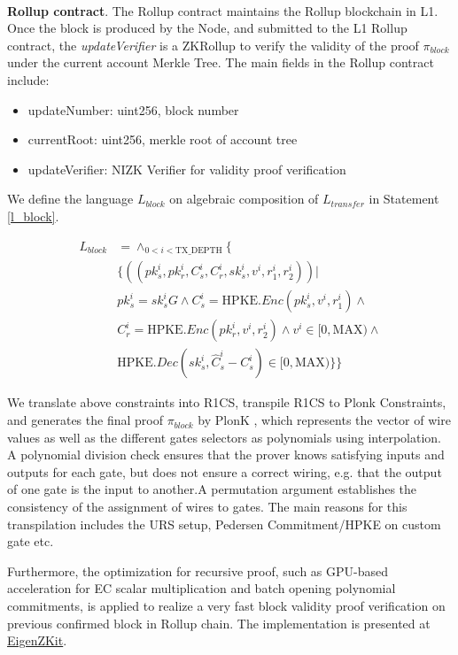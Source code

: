 \documentclass{article}
\begin{document}
~\\
\noindent\textbf{Rollup contract}. The Rollup contract maintains the Rollup blockchain in L1. Once the block is produced by the Node, and submitted to the L1 Rollup contract, the \textit{updateVerifier} is a ZKRollup to verify the validity of the proof $\pi_{block}$ under the current account Merkle Tree. The main fields in the Rollup contract include:
\begin{itemize}
    \item updateNumber: uint256, block number
    \item currentRoot: uint256, merkle root of account tree
    \item updateVerifier: NIZK Verifier for validity proof verification
\end{itemize}

We define the language $L_{block}$ on algebraic composition of $L_{transfer}$ in Statement \ref{l_block}.

\begin{equation}
\begin{aligned} \label{l_block}
    L_{block} &= \wedge_{0 < i < \mbox{TX\_DEPTH}} \{  \\
        &\{((pk_s^i, pk_r^i, C_s^i, C_r^i, sk_s^i, v^i, r_1^i, r_2^i)) | \\ 
        &pk_s^i = sk_s^iG \land C_s^i = \mbox{HPKE}.Enc(pk_s^i,v^i, r_1^i) \land \\
        &C_r^i =  \mbox{HPKE}.Enc(pk_r^i,v^i, r_2^i) \land v^i \in [0, \mbox{MAX}) \land \\
        &\mbox{HPKE}.Dec(sk_s^i, \hat{C}_s^i - C_s^i) \in [0, \mbox{MAX})\}\}
\end{aligned}
\end{equation}

We translate above constraints into R1CS, transpile R1CS to Plonk Constraints, and generates the final proof $\pi_{block}$ by PlonK \cite{gabizon2019plonk}, which represents the vector of wire values as well as the different gates selectors as polynomials using interpolation. A polynomial division check ensures that the prover knows satisfying inputs and outputs for each gate, but does not ensure a correct wiring, e.g. that the output of one gate is the input to another.A permutation argument establishes the consistency of the assignment of wires to gates. The main reasons for this transpilation includes the URS setup, Pedersen Commitment/HPKE on custom gate etc.

Furthermore, the optimization for recursive proof, such as GPU-based acceleration for EC scalar multiplication and batch opening polynomial commitments, is applied to realize a very fast block validity proof verification on previous confirmed block in Rollup chain. The implementation is presented at \href{https://github.com/ieigen/EigenZKit}{EigenZKit}.


\begin{appendices}

\end{appendices}




\end{document}
